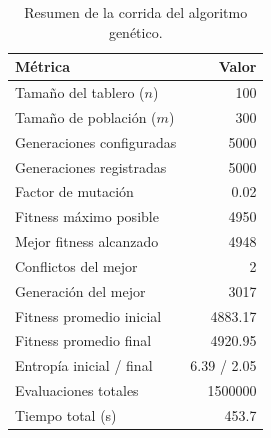 \begin{table}[H]
\centering
\small
\caption{Resumen de la corrida del algoritmo genético.}
\label{tab:resumen_ag}
\begin{tabular}{lr}
\hline
\textbf{Métrica} & \textbf{Valor} \\
\hline
Tamaño del tablero ($n$) & 100 \\
Tamaño de población ($m$) & 300 \\
Generaciones configuradas & 5000 \\
Generaciones registradas & 5000 \\
Factor de mutación & 0.02 \\
Fitness máximo posible & 4950 \\
Mejor fitness alcanzado & 4948 \\
Conflictos del mejor & 2 \\
Generación del mejor & 3017 \\
Fitness promedio inicial & 4883.17 \\
Fitness promedio final & 4920.95 \\
Entropía inicial / final & 6.39 / 2.05 \\
Evaluaciones totales & 1500000 \\
Tiempo total (s) & 453.7 \\
\hline
\end{tabular}
\end{table}
